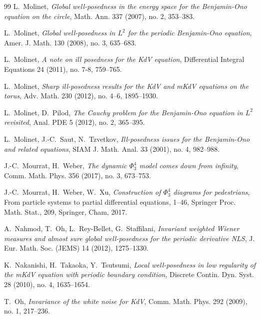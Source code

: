 \documentclass[letterpaper, 11pt,  reqno]{amsart}
\newcommand{\1}{\hspace{0.5mm}\text{I}\hspace{0.5mm}}
\numberwithin{equation}{section}
\numberwithin{theorem}{section}
\begin{document}
\begin{thebibliography}{99}
L.~Molinet, 
{\it Global well-posedness in the energy space for the Benjamin-Ono equation on the circle},
Math. Ann. 337 (2007), no. 2, 353--383. 


L.~Molinet, 
{\it Global well-posedness in $L^2$ for the periodic Benjamin-Ono equation}, 
Amer. J. Math. 130 (2008), no. 3, 635--683. 



L.~Molinet,
{\it A note on ill posedness for the KdV equation},
Differential Integral Equations 24 (2011), no. 7-8, 759--765.





L.~Molinet,
{\it Sharp ill-posedness results for the KdV and mKdV equations on the torus},
Adv. Math. 230 (2012), no. 4--6, 1895--1930.




L.~Molinet, D.~Pilod, 
{\it The Cauchy problem for the Benjamin-Ono equation in $L^2$ revisited},
 Anal. PDE 5 (2012), no. 2, 365--395. 



L.~Molinet, J.-C.~Saut, N.~Tzvetkov, 
{\it Ill-posedness issues for the Benjamin-Ono and related equations},
SIAM J. Math. Anal. 33 (2001), no. 4, 982--988. 




J.-C.~Mourrat, H.~Weber,
{\it The dynamic $\Phi^4_3$ model comes down from infinity}, 
Comm. Math. Phys. 356 (2017), no. 3, 673--753.



J.-C.~Mourrat, H.~Weber, W.~Xu,
{\it Construction of $\Phi^4_3$ diagrams for pedestrians},
 From particle systems to partial differential equations, 1--46, Springer Proc. Math. Stat., 209, Springer, Cham, 2017. 


A.~Nahmod, T.~Oh, L.~Rey-Bellet, G.~Staffilani,
{\it  Invariant weighted Wiener measures and almost sure global well-posedness for the periodic derivative NLS}, 
J. Eur. Math. Soc. (JEMS) 14 (2012), 1275--1330. 


K.~Nakanishi, H.~Takaoka, Y.~Tsutsumi, 
{\it Local well-posedness in low regularity of the mKdV equation with periodic boundary condition},
 Discrete Contin. Dyn. Syst. 28 (2010), no. 4, 1635--1654. 
 
% 
%
T.~Oh,
{\it Invariance of the white noise for KdV},
Comm. Math. Phys. 292 (2009), no. 1, 217--236.





\end{thebibliography}
\end{document}
